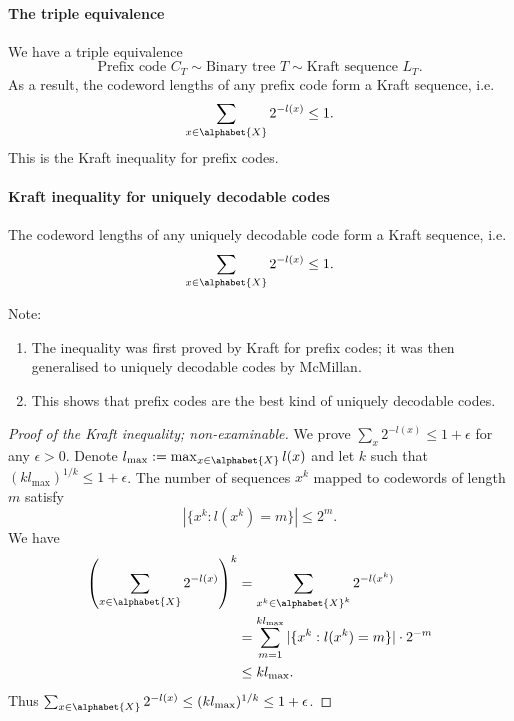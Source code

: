 \documentclass[a4paper, 11pt, openany]{book}
\begin{document}
\paragraph{The triple equivalence}

We have a triple equivalence
\[
	\text{Prefix code } C_T \sim \text{Binary tree } T \sim \text{Kraft sequence } L_T.
\]
As a result, the codeword lengths of any prefix code form a Kraft sequence, i.e.
\[
	\sum_{x \in \alphabet{X}} 2^{-l(x)} \le 1.
\]
This is the Kraft inequality for prefix codes.





\paragraph{Kraft inequality for uniquely decodable codes}

\begin{theorem}
The codeword lengths of any uniquely decodable code form a Kraft sequence, i.e.
$$
	\sum_{x \in \alphabet{X}} 2^{-l(x)} \le 1.
$$
%
\end{theorem}

Note:
\begin{enumerate}
	\item The inequality was first proved by Kraft for prefix codes; it was then generalised to uniquely decodable codes by McMillan.

	\item This shows that prefix codes are the best kind of uniquely decodable codes.
\end{enumerate}


\begin{proof}[Proof of the Kraft inequality; non-examinable]
We prove $\sum_x 2^{-l(x)} \le 1 + \epsilon$ for any $\epsilon > 0$. Denote $l_{\max} := \max_{x \in \alphabet{X}} l(x)$ and let $k$ such that $(k l_{\max})^{1/k} \le 1 + \epsilon$.
The number of sequences $x^k$ mapped to codewords of length $m$ satisfy
$$
	|\{x^k : l(x^k) = m\}| \le 2^m.
$$
We have
\begin{align*}
	\left( \sum_{x \in \alphabet{X}} 2^{-l(x)} \right)^k &= \sum_{x^k \in \alphabet{X}^k} 2^{-l(x^k)}\\
	&= \sum_{m=1}^{kl_{\max}} |\{x^k : l(x^k) = m\}| \cdot 2^{-m}\\
	&\le k l_{\max}.
\end{align*}
Thus $\sum_{x \in \alphabet{X}} 2^{-l(x)} \le (k l_{\max})^{1/k} \le 1 + \epsilon$.
\end{proof}
\end{document}
